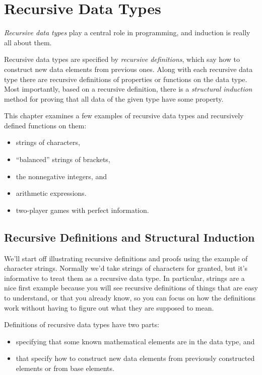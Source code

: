 \chapter{Recursive Data Types}\label{recursive_data_chap}

\emph{Recursive data types}%
play a central role in programming, and induction is really all about them.

Recursive data types are specified by \emph{recursive definitions},
which say how to construct new data elements from previous ones.
Along with each recursive data type there are recursive definitions of
properties or functions on the data type.  Most importantly, based on
a recursive definition, there is a \emph{structural induction}%
method for proving that all data of the given type have some property.

This chapter examines a few examples of recursive data types and
recursively defined functions on them:
\begin{itemize}
\item strings of characters,
\item ``balanced'' strings of brackets,
\item the nonnegative integers, and
\item arithmetic expressions.
\item two-player games with perfect information.
\end{itemize}

\section{Recursive Definitions and Structural Induction}

We'll start off illustrating recursive definitions and proofs using
the example of character strings.  Normally we'd take strings of
characters for granted, but it's informative to treat them as a
recursive data type.  In particular, strings are a nice first example
because you will see recursive definitions of things that are easy to
understand, or that you already know, so you can focus on how the
definitions work without having to figure out what they are supposed
to mean.

Definitions of recursive data types have two parts:
\begin{itemize}
\item {} specifying that some known
  mathematical elements are in the data type, and

\item {} that specify how to construct new data
  elements from previously constructed elements or from base elements.
\end{itemize}

